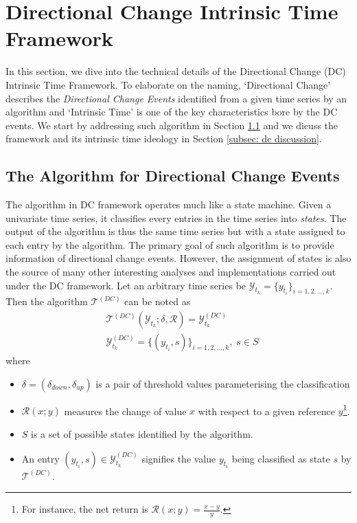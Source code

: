 \section{Directional Change Intrinsic Time Framework}

In this section, we dive into the technical details of the Directional Change (DC) Intrinsic Time Framework. To elaborate on the naming, `Directional Change' describes the \textit{Directional Change Events} identified from a given time series by an algorithm and `Intrinsic Time' is one of the key characteristics bore by the DC events. We start by addressing such algorithm in Section \ref{subsec: dc algo} and we dicuss the framework and its intrinsic time ideology in Section \ref{subsec: dc discussion}.

\subsection{The Algorithm for Directional Change Events}\label{subsec: dc algo}
The algorithm in DC framework operates much like a state machine. Given a univariate time series, it classifies every entries in the time series into \textit{states}. The output of the algorithm is thus the same time series but with a state assigned to each entry by the algorithm. The primary goal of such algorithm is to provide information of directional change events. However, the assignment of states is also the source of many other interesting analyses and implementations carried out under the DC framework. Let an arbitrary time series be $\mathcal{Y}_{t_k} = \{y_{t_i} \}_{i = 1, 2, \ldots, k}$. Then the algorithm $\mathcal{T}^{(DC)}$ can be noted as
\begin{align*}
    &\mathcal{T}^{(DC)} (\mathcal{Y}_{t_k} ; \delta, \mathcal{R}) = \mathcal{Y}_{t_k}^{(DC)} \\
    &\mathcal{Y}_{t_k}^{(DC)} = \{ (y_{t_i}, s)\}_{i = 1, 2, \ldots, k}, \; s \in S
\end{align*}
where
\begin{itemize}
    \setlength\itemsep{-5pt}
    \item $\delta = (\delta_{down}, \delta_{up})$ is a pair of threshold values parameterising the classification
    \item $\mathcal{R} (x; y)$ measures the change of value $x$ with respect to a given reference $y$\footnote{For instance, the net return is $\mathcal{R} (x; y) = \frac{x - y}{y}$.}.
    \item $S$ is a set of possible states identified by the algorithm. 
    \item An entry $(y_{t_i}, s) \in \mathcal{Y}_{t_k}^{(DC)}$ signifies the value $y_{t_i}$ being classified as state $s$ by $\mathcal{T}^{(DC)}$.
\end{itemize}
